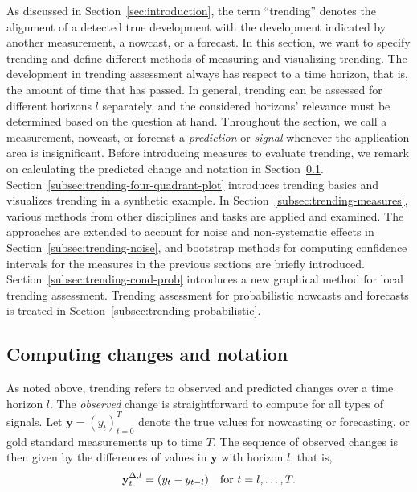 
As discussed in Section~\ref{sec:introduction}, the term \enquote{trending} denotes the alignment of a detected true development with the development indicated by another measurement, a nowcast, or a forecast.
In this section, we want to specify trending and define different methods of measuring and visualizing trending.
The development in trending assessment always has respect to a time horizon, that is, the amount of time that has passed. 
In general, trending can be assessed for different horizons $l$ separately, and the considered horizons' relevance must be determined based on the question at hand.
Throughout the section, we call a measurement, nowcast, or forecast a \textit{prediction} or \textit{signal} whenever the application area is insignificant.
Before introducing measures to evaluate trending, we remark on calculating the predicted change and notation in Section~\ref{subsec:notation}.
Section~\ref{subsec:trending-four-quadrant-plot} introduces trending basics and visualizes trending in a synthetic example.
In Section~\ref{subsec:trending-measures}, various methods from other disciplines and tasks are applied and examined.
The approaches are extended to account for noise and non-systematic effects in Section~\ref{subsec:trending-noise}, and bootstrap methods for computing confidence intervals for the measures in the previous sections are briefly introduced.
Section~\ref{subsec:trending-cond-prob} introduces a new graphical method for local trending assessment.
Trending assessment for probabilistic nowcasts and forecasts is treated in Section~\ref{subsec:trending-probabilistic}.

\subsection{Computing changes and notation}\label{subsec:notation}

As noted above, trending refers to observed and predicted changes over a time horizon $l$.
The \textit{observed} change is straightforward to compute for all types of signals.
Let $\mathbf{y} = (y_t)_{t=0}^T$ denote the true values for nowcasting or forecasting, or gold standard measurements up to time $T$.
The sequence of observed changes is then given by the differences of values in $\mathbf{y}$ with horizon $l$, that is,
\begin{equation}\label{eq:diffy}
    \mathbf{y}^{\Delta,l}_t = (y_{t} - y_{t-l}) \quad \text{for}\ t = l, \dots, T.
\end{equation}

